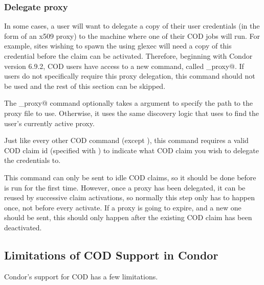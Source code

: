 
\subsubsection{\label{sec:cod-claim-delegate}Delegate proxy}

In some cases, a user will want to delegate a copy of their user
credentials (in the form of an x509 proxy) to the machine where one of
their COD jobs will run.
For example, sites wishing to spawn the  using glexec
will need a copy of this credential before the claim can be activated.
Therefore, beginning with Condor version 6.9.2, COD users have access
to a new command, called \verb@delegate_proxy@.
If users do not specifically require this proxy delegation, this
command should not be used and the rest of this section can be skipped.

The \verb@delegate_proxy@ command optionally takes a 
argument to specify the path to the proxy file to use.
Otherwise, it uses the same discovery logic that  uses
to find the user's currently active proxy.

Just like every other COD command (except \verb@request@), this
command requires a valid COD claim id (specified with ) to
indicate what COD claim you wish to delegate the credentials to.

This command can only be sent to idle COD claims, so it should be done
before \verb@activate@ is run for the first time.
However, once a proxy has been delegated, it can be reused by
successive claim activations, so normally this step only has to happen
once, not before every activate.
If a proxy is going to expire, and a new one should be sent, this
should only happen after the existing COD claim has been deactivated.


\subsection{\label{sec:cod-limitations}Limitations of COD Support in Condor}

Condor's support for COD has a few limitations.

